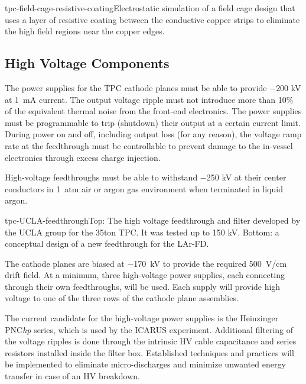 \begin{cdrfigure}{tpc-field-cage-resistive-coating}{Electrostatic simulation of a field cage design that uses a layer of resistive coating between the conductive copper strips to eliminate the high field regions near the copper edges.}
\end{cdrfigure}



\subsection{High Voltage Components}  
\label{subsec:fd-ref-hv}
   
The power supplies for the TPC cathode planes 
must be able to provide $-200$ kV at 1~mA current. The output voltage ripple 
must not introduce more than 10\% of the equivalent thermal noise from the front-end electronics. 
The power supplies must be programmable to trip (shutdown) 
their output at a certain current limit.  During power on and off, 
including output loss (for any reason), the voltage ramp rate at the 
feedthrough must be controllable to prevent 
damage to the in-vessel electronics through excess charge injection.

High-voltage feedthroughs must be able to withstand $-$250 kV 
at their center conductors in 1~atm air or argon gas environment when terminated in liquid argon.

\begin{cdrfigure}{tpc-UCLA-feedthrough}{Top: The high voltage feedthrough and filter developed by the UCLA 
group for the 35ton TPC.  It was tested up to 150 kV.  Bottom: a conceptual design of a new feedthrough for the LAr-FD.}
\end{cdrfigure}


The cathode planes are biased at $-$170~kV to provide the required 
500~V/cm drift field. At a minimum, three high-voltage power 
supplies, each connecting through their own feedthroughs, will be used. Each supply will
provide high voltage to one of the three rows of the cathode plane assemblies.

The current candidate for the high-voltage power supplies is 
the Heinzinger PNC{\it hp} series, which is used by the ICARUS 
experiment.  Additional filtering of the voltage ripples is done through the intrinsic HV cable capacitance 
and series resistors installed inside the filter box. Established techniques and practices will be implemented to eliminate 
micro-discharges and minimize unwanted energy transfer in case of an HV breakdown. 
  
